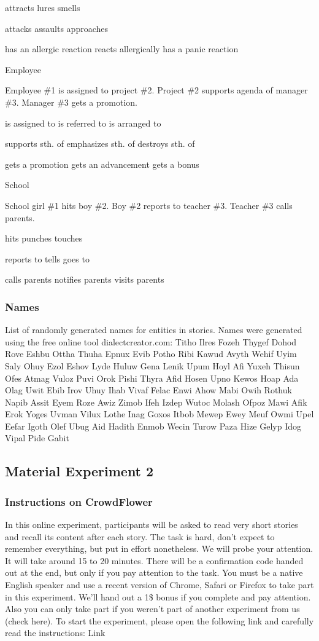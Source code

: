 attracts
lures
smells

attacks
assaults
approaches

has an allergic reaction
reacts allergically
has a panic reaction


Employee

Employee \#1 is assigned to project \#2.
Project \#2 supports agenda of manager \#3.
Manager \#3 gets a promotion.

is assigned to
is referred to
is arranged to

supports sth. of
emphasizes sth. of
destroys sth. of

gets a promotion
gets an advancement
gets a bonus


School

School girl \#1 hits boy \#2.
Boy \#2 reports to teacher \#3.
Teacher \#3 calls parents.

hits
punches
touches

reports to
tells
goes to

calls parents
notifies parents
visits parents


\subsubsection{Names}
List of randomly generated names for entities in stories. Names were generated using the free online tool dialectcreator.com:\newline
Titho
Ilres
Fozeh
Thygef
Dohod
Rove
Eshbu
Ottha
Thuha
Epnux
Evib
Potho
Ribi
Kawud
Avyth
Wehif
Uyim
Saly
Ohuy
Ezol
Eshov
Lyde
Huluw
Gena
Lenik
Upum
Hoyl
Afi
Yuxeh
Thisun
Ofes
Atmag
Vuloz
Puvi
Orok
Pishi
Thyra
Afid
Hosen
Upno
Kewos
Hoap
Ada
Olag
Uwit
Ebib
Irov
Uhuy
Ihab
Vivaf
Felac
Enwi
Ahow
Mabi
Owih
Rothuk
Napib
Assit
Eyem
Roze
Awiz
Zimob
Ifeh
Izdep
Wutoc
Molash
Ofpoz
Mawi
Afik
Erok
Yoges
Uvman
Vilux
Lothe
Inag
Goxos
Itbob
Mewep
Ewey
Meuf
Owmi
Upel
Eefar
Igoth
Olef
Ubug
Aid
Hadith
Enmob
Wecin
Turow
Paza
Hize
Gelyp
Idog
Vipal
Pide
Gabit

\subsection{Material Experiment 2}
\subsubsection{Instructions on CrowdFlower}
In this online experiment, participants will be asked to read very short stories and recall its content after each story. The task is hard, don't expect to remember everything, but put in effort nonetheless. We will probe your attention. It will take around 15 to 20 minutes. There will be a confirmation code handed out at the end, but only if you pay attention to the task. You must be a native English speaker and use a recent version of Chrome, Safari or Firefox to take part in this experiment. We'll hand out a 1\$ bonus if you complete and pay attention. Also you can only take part if you weren't part of another experiment from us (check here).
To start the experiment, please open the following link and carefully read the instructions: Link

